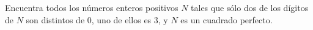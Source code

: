 Encuentra todos los números enteros positivos $N$ tales que sólo dos de los dígitos de $ N$ son distintos de $ 0$, uno de ellos es $ 3$, y $N$ es un cuadrado perfecto.

